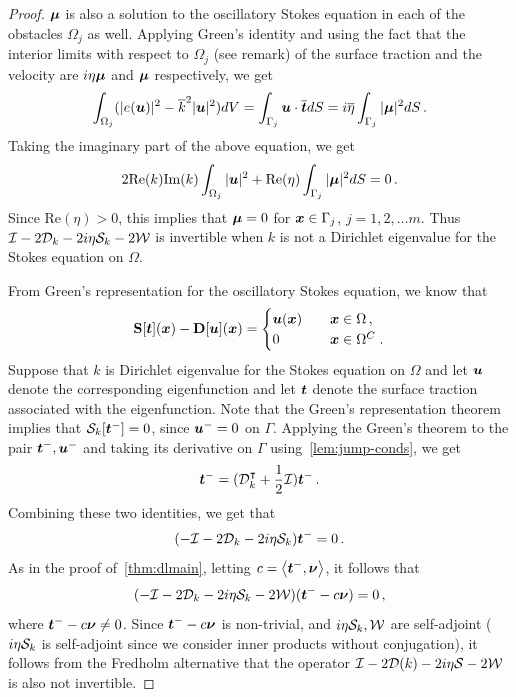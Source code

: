 \begin{proof}
${\boldsymbol \mu}$ is also a solution to the oscillatory Stokes equation
in each of the obstacles $\Omega_{j}$ as well.
Applying Green's identity and using the fact that 
the interior limits with respect to $\Omega_{j}$ (see remark)
of the surface traction and the velocity
are $i\eta {\boldsymbol \mu}$ and ${\boldsymbol \mu}$ respectively, we get
\begin{equation}
\int_{\Omega_{j}} (|e({\boldsymbol u})|^{2} - \overline{k}^{2} |{\boldsymbol u}|^2) dV 
= \int_{\Gamma_{j}} {\boldsymbol u} \cdot \overline{{\boldsymbol t}} dS = 
i\overline{\eta}\int_{\Gamma_{j}} |{\boldsymbol \mu}|^2 dS \, .
\end{equation}
Taking the imaginary part of the above equation, we get
\begin{equation}
2 \text{Re}(k) \text{Im}(k) \int_{\Omega_{j}} |{\boldsymbol u}|^2 + \text{Re}(\eta)
\int_{\Gamma_{j}} |{\boldsymbol \mu}|^2 dS = 0 \, .
\end{equation}
Since $\text{Re}(\eta)>0$, this implies that ${\boldsymbol \mu}=0$ for ${\boldsymbol x} \in \Gamma_{j}$, $j=1,2,\ldots m$. 
Thus $\mathcal I - 2{\mathcal D}_{k} -2i\eta{\mathcal S}_{k} -2{\mathcal W}$ is invertible when $k$ 
is not a Dirichlet eigenvalue for the Stokes equation on $\Omega$.


From Green's representation for the oscillatory Stokes equation, 
we know that 
  \begin{equation} \label{eq:rep-theorem}
    {\bf S} [{\boldsymbol t}]({\boldsymbol x}) - {\bf D}[{\boldsymbol u}]({\boldsymbol x}) = \begin{cases} 
    {\boldsymbol u}({\boldsymbol x}) &\quad {\boldsymbol x} \in \Omega \, , \\
    0 &\quad {\boldsymbol x} \in \Omega^{C} \; .
    \end{cases}
  \end{equation}
Suppose that $k$ is Dirichlet eigenvalue for the Stokes equation on $\Omega$
and let ${\boldsymbol u}$ denote the corresponding eigenfunction and let ${\boldsymbol t}$ denote
the surface traction associated with the eigenfunction.
Note that the Green's representation theorem implies that 
${\mathcal S}_{k}[{\boldsymbol t}^{-}] = 0$, since ${\boldsymbol u}^{-}=0$ on $\Gamma$. 
Applying the Green's theorem to the pair ${\boldsymbol t}^{-}, {\boldsymbol u}^{-}$ and taking 
its derivative on $\Gamma$ using~\cref{lem:jump-conds}, we get
\begin{equation}
{\boldsymbol t}^{-} = ({\mathcal D}^{\intercal}_{k} + \frac{1}{2} \mathcal I) {\boldsymbol t}^{-} \, . 
\end{equation}
Combining these two identities, we get
that
\begin{equation}
(-\mathcal I - 2{\mathcal D}_{k} -2i\eta {\mathcal S}_{k}) {\boldsymbol t}^{-} = 0 \, .
\end{equation}
As in the proof of~\cref{thm:dlmain}, letting $c = \left< {\boldsymbol t}^{-} ,{\boldsymbol \nu} \right>$, 
it follows that
\begin{equation}
(-\mathcal I - 2{\mathcal D}_{k} - 2i \eta {\mathcal S}_{k} - 2{\mathcal W}) ({\boldsymbol t}^{-} - c{\boldsymbol \nu}) = 0 \, ,
\end{equation}
where ${\boldsymbol t}^{-} - c{\boldsymbol \nu} \neq 0$.
Since ${\boldsymbol t}^{-} - c{\boldsymbol \nu}$ is non-trivial, and $i\eta {\mathcal S}_{k}, {\mathcal W}$ are self-adjoint ($i\eta {\mathcal S}_{k}$ 
is self-adjoint since we consider inner products without conjugation), 
it follows from the Fredholm alternative 
that the operator $\mathcal I - 2{\mathcal D}(k) -2i\eta {\mathcal S} - 2{\mathcal W}$ is also not invertible.
\end{proof}

